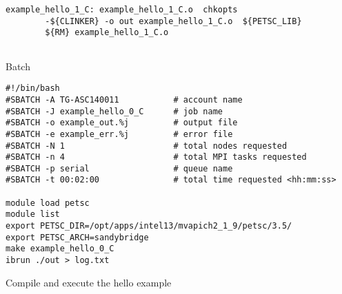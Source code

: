 \documentclass{article}
\begin{document}
\begin{description}
\begin{scriptsize}
\begin{verbatim}
example_hello_1_C: example_hello_1_C.o  chkopts
        -${CLINKER} -o out example_hello_1_C.o  ${PETSC_LIB}
        ${RM} example_hello_1_C.o
	
\end{verbatim}\end{scriptsize}
\item Batch
\begin{scriptsize}\begin{verbatim}
#!/bin/bash
#SBATCH -A TG-ASC140011           # account name
#SBATCH -J example_hello_0_C      # job name
#SBATCH -o example_out.%j         # output file
#SBATCH -e example_err.%j         # error file
#SBATCH -N 1                      # total nodes requested
#SBATCH -n 4                      # total MPI tasks requested
#SBATCH -p serial                 # queue name
#SBATCH -t 00:02:00               # total time requested <hh:mm:ss>

module load petsc
module list
export PETSC_DIR=/opt/apps/intel13/mvapich2_1_9/petsc/3.5/
export PETSC_ARCH=sandybridge
make example_hello_0_C
ibrun ./out > log.txt
\end{verbatim}\end{scriptsize}
\end{description}
Compile and execute the hello example
\end{document}
